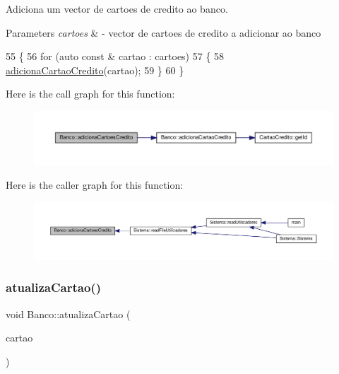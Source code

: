 Adiciona um vector de cartoes de credito ao banco. 


\begin{DoxyParams}{Parameters}
{\em cartoes} & -\/ vector de cartoes de credito a adicionar ao banco \\
\hline
\end{DoxyParams}

\begin{DoxyCode}
55 \{
56     \textcolor{keywordflow}{for} (\textcolor{keyword}{auto} \textcolor{keyword}{const} & cartao : cartoes)
57     \{
58         \hyperlink{classBanco_a2ac1bb3c6a742743bcbb6dd0a312d74d}{adicionaCartaoCredito}(cartao);
59     \}
60 \}
\end{DoxyCode}
Here is the call graph for this function\+:
\nopagebreak
\begin{figure}[H]
\begin{center}
\leavevmode
\includegraphics[width=350pt]{classBanco_a5f36ab07909fc570d158a21e2e6398f5_cgraph}
\end{center}
\end{figure}
Here is the caller graph for this function\+:
\nopagebreak
\begin{figure}[H]
\begin{center}
\leavevmode
\includegraphics[width=350pt]{classBanco_a5f36ab07909fc570d158a21e2e6398f5_icgraph}
\end{center}
\end{figure}
\mbox{\label{classBanco_a8c8f743903ba86129b62afbb3813e6f0}} 
\subsubsection{\texorpdfstring{atualiza\+Cartao()}{atualizaCartao()}}
{\footnotesize\ttfamily void Banco\+::atualiza\+Cartao (\begin{DoxyParamCaption}\item[{\hyperlink{classCartaoCredito}{Cartao\+Credito} \&}]{cartao }\end{DoxyParamCaption})}



